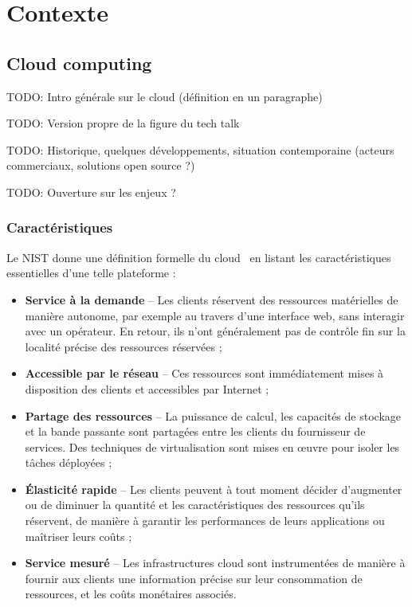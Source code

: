 \clearemptydoublepage
\chapter{Contexte}

\section{Cloud computing}

TODO: Intro générale sur le cloud (définition en un paragraphe)

TODO: Version propre de la figure du tech talk

TODO: Historique, quelques développements, situation contemporaine (acteurs commerciaux, solutions open source ?)

TODO: Ouverture sur les enjeux ?

\subsection{Caractéristiques}

Le NIST donne une définition formelle du cloud~\cite{mellNISTDefinitionCloud} en listant les caractéristiques essentielles d'une telle plateforme :

\begin{itemize}
    \item \textbf{Service à la demande} -- Les clients réservent des ressources matérielles de manière autonome, par exemple au travers d'une interface web, sans interagir avec un opérateur. En retour, ils n'ont généralement pas de contrôle fin sur la localité précise des ressources réservées ;
    \item \textbf{Accessible par le réseau} -- Ces ressources sont immédiatement mises à disposition des clients et accessibles par Internet ;
    \item \textbf{Partage des ressources} -- La puissance de calcul, les capacités de stockage et la bande passante sont partagées entre les clients du fournisseur de services. Des techniques de virtualisation sont mises en œuvre pour isoler les tâches déployées ;
    \item \textbf{Élasticité rapide} -- Les clients peuvent à tout moment décider d'augmenter ou de diminuer la quantité et les caractéristiques des ressources qu'ils réservent, de manière à garantir les performances de leurs applications ou maîtriser leurs coûts ;
    \item \textbf{Service mesuré} -- Les infrastructures cloud sont instrumentées de manière à fournir aux clients une information précise sur leur consommation de ressources, et les coûts monétaires associés.
\end{itemize}

